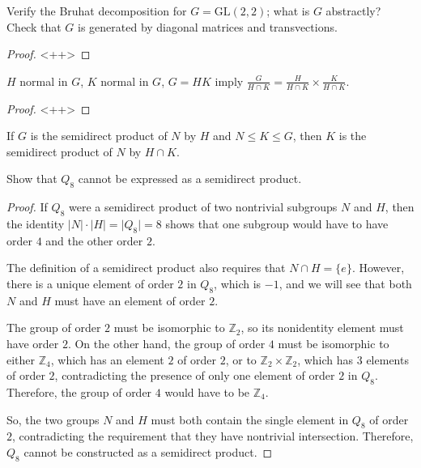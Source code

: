 \documentclass[12pt]{article}
\newcommand{\Z}{\mathbb{Z}}
\theoremstyle{definition}
\newenvironment{problem}[2][Problem]{\begin{trivlist}
\item[\hskip \labelsep {\bfseries #1}\hskip \labelsep {\bfseries #2.}]}{\end{trivlist}}
\begin{document}
\begin{problem}{3}
	Verify the Bruhat decomposition for $G = \text{GL}(2,2)$; what is $G$ abstractly? Check that $G$ is generated by diagonal matrices and transvections. 
	\begin{proof}
	<++>	
	\end{proof}
\end{problem}
\begin{problem}{4}
	$H$ normal in $G$, $K$ normal in $G$, $G = HK$ imply $\frac{ G}{H \cap K} = \frac{H}{H \cap K} \times \frac{K}{H \cap K}$.
	\begin{proof}
		<++>
	\end{proof}
\end{problem}
\begin{problem}{5}
	If $G$ is the semidirect product of $N$ by $H$ and $N \leq K \leq G$, then $K$ is the semidirect product of $N$ by $H \cap K$.
\end{problem}
\begin{problem}{6}
	Show that $Q_8$ cannot be expressed as a semidirect product.
	\begin{proof}
	 If $Q_8$ were a semidirect product of two nontrivial subgroups $N$ and $H$, then the identity $\lvert N \rvert \cdot \lvert H \rvert = \lvert Q_8 \rvert = 8$ shows that one subgroup would have to have order $4$ and the other order $2$.
	 \par The definition of a semidirect product also requires that $N \cap H = \{e\}$. However, there is a unique element of order $2$ in $Q_8$, which is $-1$, and we will see that both $N$ and $H$ must have an element of order $2$.
	 \par The group of order $2$ must be isomorphic to $\Z_2$, so its nonidentity element must have order $2$. On the other hand, the group of order $4$ must be isomorphic to either $\Z_4$, which has an  element $2$ of order $2$, or to $\Z_2 \times \Z_2$, which has $3$ elements of order $2$, contradicting the presence of only one element of order $2$ in $Q_8$. Therefore, the group of order $4$ would have to be $\Z_4$.
	 \par So, the two groups $N$ and $H$ must both contain the single element in $Q_8$ of order $2$, contradicting the requirement that they have nontrivial intersection. Therefore, $Q_8$ cannot be constructed as a semidirect product.
	\end{proof}
\end{problem}
\end{document}
